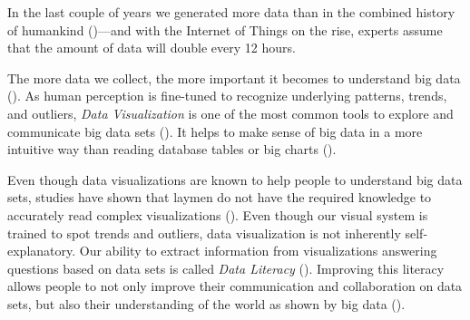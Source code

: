 
In the last couple of years we generated more data than in the combined history of humankind (\cite{helbing2019will})---and with the Internet of Things on the rise, experts assume that the amount of data will double every 12 hours.

The more data we collect, %
the more important it becomes to understand big data (\cite{bornerDataVisualizationLiteracy2019}). As human perception is fine-tuned to recognize underlying patterns, trends, and outliers, \emph{Data Visualization} is one of the most common tools to explore and communicate big data sets (\cite{heerTourVisualizationZoo2010}). It helps to make sense of big data in a more intuitive way than reading database tables or big charts (\cite{donalekImmersiveCollaborativeData2014}).

Even though data visualizations are known to help people to understand big data sets, studies have shown that laymen do not have the required knowledge to accurately read complex visualizations (\cite{bornerInvestigatingAspectsData2016}). %
Even though our visual system is trained to spot trends and outliers, data visualization is not inherently self-explanatory. Our ability to extract information from visualizations answering questions based on data sets is called \emph{Data Literacy} (\cite{boyPrincipledWayAssessing2014}). Improving this literacy allows people to not only improve their communication and collaboration on data sets, but also their understanding of the world as shown by big data (\cite{bornerDataVisualizationLiteracy2019}). 
